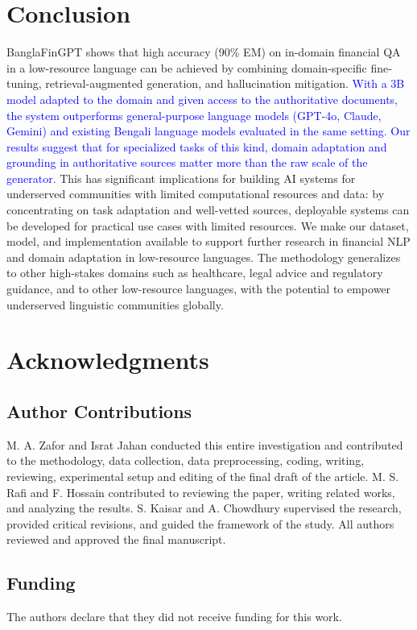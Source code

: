 \documentclass{article}
\newcommand{\revised}[1]{\textcolor{blue}{#1}}
\newcommand{\revised}[1]{#1}
\begin{document}
\section{Conclusion}

BanglaFinGPT shows that high accuracy (90\% EM) on in-domain financial QA in a
low-resource language can be achieved by combining domain-specific fine-tuning,
retrieval-augmented generation, and hallucination mitigation. \revised{With a 3B model
adapted to the domain and given access to the authoritative documents, the system
outperforms general-purpose language models (GPT-4o, Claude, Gemini) and existing
Bengali language models evaluated in the same setting. Our results suggest that for
specialized tasks of this kind, domain adaptation and grounding in authoritative sources
matter more than the raw scale of the generator.} This has significant implications for
building AI systems for underserved communities with limited computational resources and
data: by concentrating on task adaptation and well-vetted sources, deployable systems can
be developed for practical use cases with limited resources. We make our dataset, model,
and implementation available to support further research in financial NLP and domain
adaptation in low-resource languages. The methodology generalizes to other high-stakes
domains such as healthcare, legal advice and regulatory guidance, and to other
low-resource languages, with the potential to empower underserved linguistic communities
globally.

\section*{Acknowledgments}

\subsection*{Author Contributions}
M. A. Zafor and Israt Jahan conducted this entire investigation and contributed to the
methodology, data collection, data preprocessing, coding, writing, reviewing,
experimental setup and editing of the final draft of the article. M. S. Rafi and
F. Hossain contributed to reviewing the paper, writing related works, and analyzing the
results. S. Kaisar and A. Chowdhury supervised the research, provided critical
revisions, and guided the framework of the study. All authors reviewed and approved the
final manuscript.

\subsection*{Funding}
The authors declare that they did not receive funding for this work.
\end{document}
